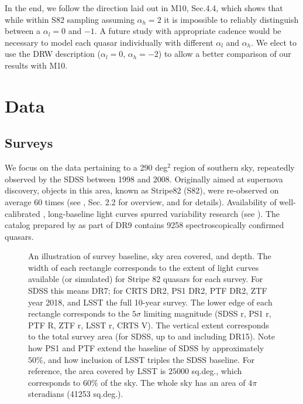 \documentclass[twocolumn]{aastex62}
\begin{document}
In the end, we follow the direction laid out in M10, Sec.4.4, which shows that while within S82 sampling assuming $\alpha_{h}= 2 $ it is impossible to reliably distinguish between a $\alpha_{l}=0$ and $-1$. A future study with appropriate cadence would be necessary to model each quasar individually with different $\alpha_{l}$ and $\alpha_{h}$. We elect to use the DRW description ($\alpha_{l}=0$, $\alpha_{h}=-2$) to allow a better comparison of our results with M10. 

%
%
%
%
%

\section{Data}\label{sec:data}
\subsection{Surveys}
We focus on the data pertaining to a 290 deg$^{2}$ region of southern sky, repeatedly observed by the SDSS between 1998 and 2008. Originally aimed at supernova discovery, objects in this area, known as Stripe82 (S82), were  re-observed on average 60 times (see \citealt{macleod2012}, Sec. 2.2 for overview, and \citealt{annis2014} for details). Availability of well-calibrated \citep{ivezic2007}, long-baseline light curves spurred variability research (see \citealt{sesar2007}). The catalog prepared by \citet{schneider2008} as part of DR9  contains 9258 spectroscopically confirmed quasars.  


\begin{figure*}
\caption{An illustration of survey baseline, sky area covered, and depth. The width of each rectangle corresponds to the extent of light curves available (or simulated) for Stripe 82 quasars for each survey. For SDSS this means DR7; for CRTS DR2, PS1 DR2, PTF DR2, ZTF year 2018, and LSST the full 10-year survey. The lower edge of each rectangle corresponds to the $5\sigma$ limiting magnitude (SDSS r, PS1 r, PTF R, ZTF r, LSST r, CRTS V). The vertical extent corresponds to the total survey area (for SDSS, up to and including DR15).  Note how PS1 and PTF extend the baseline of SDSS by approximately $50\%$, and how inclusion of LSST triples the SDSS baseline. For reference, the area covered by LSST is $25 000$ sq.deg., which corresponds to  $60\%$ of the sky. The whole sky has an area of $4\pi$ steradians (41253 sq.deg.).}
\label{fig:lcExtent}
\end{figure*} 
\end{document}
